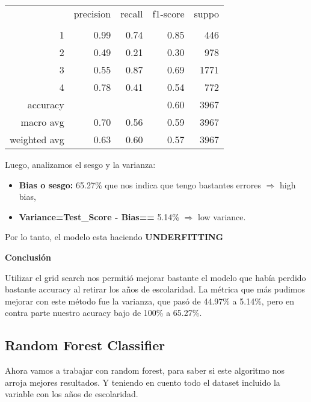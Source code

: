 \documentclass[a4paper]{article}
\begin{document}
            \begin{table}[H]
                \centering
                \begin{tabular}{rrrrr}
                    ~ & precision & recall & f1-score & suppo \\
                    & & & & \\
                    1 & 0.99 & 0.74 & 0.85 & 446 \\
                    2 & 0.49 & 0.21 & 0.30 & 978 \\
                    3 & 0.55 & 0.87 & 0.69 & 1771 \\
                    4 & 0.78 & 0.41 & 0.54 & 772 \\
                    accuracy & & & 0.60 & 3967 \\
                    macro avg & 0.70 & 0.56 & 0.59 & 3967 \\
                    weighted avg & 0.63 & 0.60 & 0.57 & 3967 \\
                \end{tabular}
            \end{table}

            Luego, analizamos el sesgo y la varianza:
            \begin{itemize}
                \item \textbf{Bias o sesgo:} 65.27\% que nos indica que tengo bastantes errores $\Rightarrow$ high bias,
                \item \textbf{Variance=Test\_Score - Bias==} 5.14\%  $\Rightarrow$ low variance.
            \end{itemize}

            Por lo tanto, el modelo esta haciendo \textbf{UNDERFITTING}

            \textbf{Conclusión}
            
            Utilizar el grid search nos permitió mejorar bastante el modelo que había perdido bastante accuracy al retirar los años de escolaridad. La métrica que más pudimos mejorar con este método fue la varianza, que pasó de 44.97\% a 5.14\%, pero en contra parte nuestro acuracy bajo de 100\% a 65.27\%.

    \subsection{Random Forest Classifier}
        
        Ahora vamos a trabajar con random forest, para saber si este algoritmo nos arroja mejores resultados. Y teniendo en cuento todo el dataset incluido la variable con los años de escolaridad. 
\end{document}
